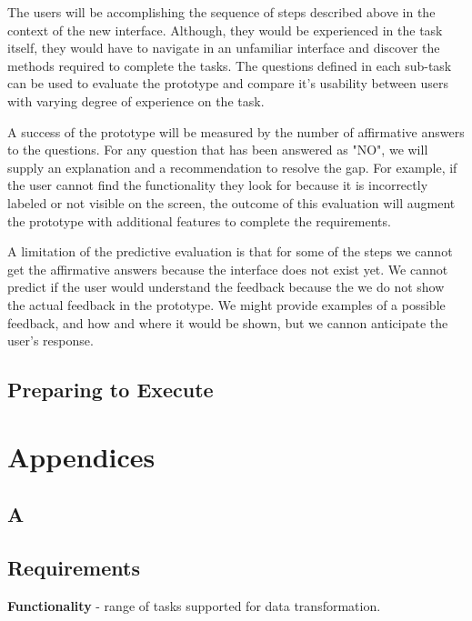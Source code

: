 \documentclass[12pt,letterpaper]{article}
\begin{document}
The users will be accomplishing the sequence of steps described above in the context of the new interface. Although, they would be experienced in the task itself, they would have to navigate in an unfamiliar interface and discover the methods required to complete the tasks. The questions defined in each sub-task can be used to evaluate the prototype and compare it's usability between users with varying degree of experience on the task. 

A success of the prototype will be measured by the number of affirmative answers to the questions. For any question that has been answered as "NO", we will supply an explanation and a recommendation to resolve the gap. For example, if the user cannot find the functionality they look for because it is incorrectly labeled or not visible on the screen, the outcome of this evaluation will augment the prototype with additional features to complete the requirements. 

A limitation of the predictive evaluation is that for some of the steps we cannot get the affirmative answers because the interface does not exist yet. We cannot predict if the user would understand the feedback because the we do not show the actual feedback in the prototype. We might provide examples of a possible feedback, and how and where it would be shown, but we cannon anticipate the user's response. 

\subsection*{Preparing to Execute}



 


\newpage
\section*{Appendices}

\appendix


\subsection*{A}
\subsection*{Requirements}

\textbf{Functionality} - range of tasks supported for data transformation.
\end{document}
